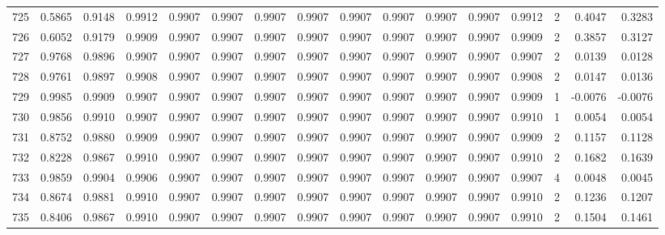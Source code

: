 \begin{tabular}{lrrrrrrrrrrrrrrr}
725 &      0.5865 &  0.9148 &  0.9912 &  0.9907 &  0.9907 &  0.9907 &  0.9907 &  0.9907 &  0.9907 &  0.9907 &   0.9907 &     0.9912 &      2 &                    0.4047 &                     0.3283 \\
726 &      0.6052 &  0.9179 &  0.9909 &  0.9907 &  0.9907 &  0.9907 &  0.9907 &  0.9907 &  0.9907 &  0.9907 &   0.9907 &     0.9909 &      2 &                    0.3857 &                     0.3127 \\
727 &      0.9768 &  0.9896 &  0.9907 &  0.9907 &  0.9907 &  0.9907 &  0.9907 &  0.9907 &  0.9907 &  0.9907 &   0.9907 &     0.9907 &      2 &                    0.0139 &                     0.0128 \\
728 &      0.9761 &  0.9897 &  0.9908 &  0.9907 &  0.9907 &  0.9907 &  0.9907 &  0.9907 &  0.9907 &  0.9907 &   0.9907 &     0.9908 &      2 &                    0.0147 &                     0.0136 \\
729 &      0.9985 &  0.9909 &  0.9907 &  0.9907 &  0.9907 &  0.9907 &  0.9907 &  0.9907 &  0.9907 &  0.9907 &   0.9907 &     0.9909 &      1 &                   -0.0076 &                    -0.0076 \\
730 &      0.9856 &  0.9910 &  0.9907 &  0.9907 &  0.9907 &  0.9907 &  0.9907 &  0.9907 &  0.9907 &  0.9907 &   0.9907 &     0.9910 &      1 &                    0.0054 &                     0.0054 \\
731 &      0.8752 &  0.9880 &  0.9909 &  0.9907 &  0.9907 &  0.9907 &  0.9907 &  0.9907 &  0.9907 &  0.9907 &   0.9907 &     0.9909 &      2 &                    0.1157 &                     0.1128 \\
732 &      0.8228 &  0.9867 &  0.9910 &  0.9907 &  0.9907 &  0.9907 &  0.9907 &  0.9907 &  0.9907 &  0.9907 &   0.9907 &     0.9910 &      2 &                    0.1682 &                     0.1639 \\
733 &      0.9859 &  0.9904 &  0.9906 &  0.9907 &  0.9907 &  0.9907 &  0.9907 &  0.9907 &  0.9907 &  0.9907 &   0.9907 &     0.9907 &      4 &                    0.0048 &                     0.0045 \\
734 &      0.8674 &  0.9881 &  0.9910 &  0.9907 &  0.9907 &  0.9907 &  0.9907 &  0.9907 &  0.9907 &  0.9907 &   0.9907 &     0.9910 &      2 &                    0.1236 &                     0.1207 \\
735 &      0.8406 &  0.9867 &  0.9910 &  0.9907 &  0.9907 &  0.9907 &  0.9907 &  0.9907 &  0.9907 &  0.9907 &   0.9907 &     0.9910 &      2 &                    0.1504 &                     0.1461 \\

\end{tabular}
